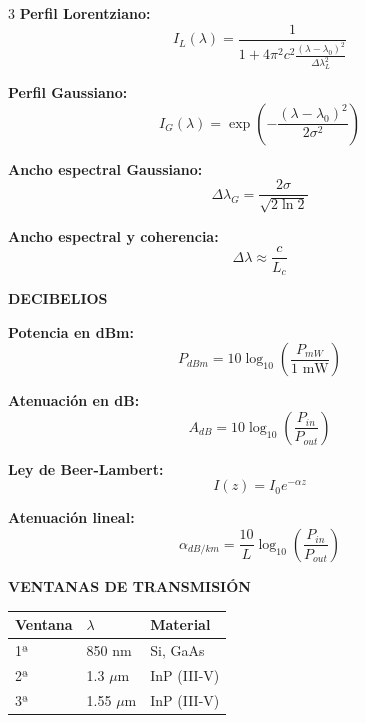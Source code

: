\documentclass[10pt,a4paper,landscape]{article}
\newcommand{\secbox}[1]{\colorbox{blue!20}{\textbf{#1}}}
\begin{document}
\begin{multicols}{3}
\textbf{Perfil Lorentziano:}
\begin{equation*}
\boxed{I_L(\lambda) = \frac{1}{1 + 4\pi^2 c^2 \frac{(\lambda - \lambda_0)^2}{\Delta\lambda_L^2}}}
\end{equation*}

\textbf{Perfil Gaussiano:}
\begin{equation*}
\boxed{I_G(\lambda) = \exp\left(-\frac{(\lambda - \lambda_0)^2}{2\sigma^2}\right)}
\end{equation*}

\textbf{Ancho espectral Gaussiano:}
\begin{equation*}
\boxed{\Delta\lambda_G = \frac{2\sigma}{\sqrt{2\ln 2}}}
\end{equation*}

\textbf{Ancho espectral y coherencia:}
\begin{equation*}
\boxed{\Delta\lambda \approx \frac{c}{L_c}}
\end{equation*}

\secbox{DECIBELIOS}

\textbf{Potencia en dBm:}
\begin{equation*}
\boxed{P_{dBm} = 10\log_{10}\left(\frac{P_{mW}}{1\text{ mW}}\right)}
\end{equation*}

\textbf{Atenuación en dB:}
\begin{equation*}
\boxed{A_{dB} = 10\log_{10}\left(\frac{P_{in}}{P_{out}}\right)}
\end{equation*}

\textbf{Ley de Beer-Lambert:}
\begin{equation*}
\boxed{I(z) = I_0 e^{-\alpha z}}
\end{equation*}

\textbf{Atenuación lineal:}
\begin{equation*}
\boxed{\alpha_{dB/km} = \frac{10}{L}\log_{10}\left(\frac{P_{in}}{P_{out}}\right)}
\end{equation*}

\secbox{VENTANAS DE TRANSMISIÓN}

\begin{tabular}{lll}
\toprule
\textbf{Ventana} & \textbf{$\lambda$} & \textbf{Material} \\
\midrule
1ª & 850 nm & Si, GaAs \\
2ª & 1.3 $\mu$m & InP (III-V) \\
3ª & 1.55 $\mu$m & InP (III-V) \\
\bottomrule
\end{tabular}


\end{multicols}
\end{document}

